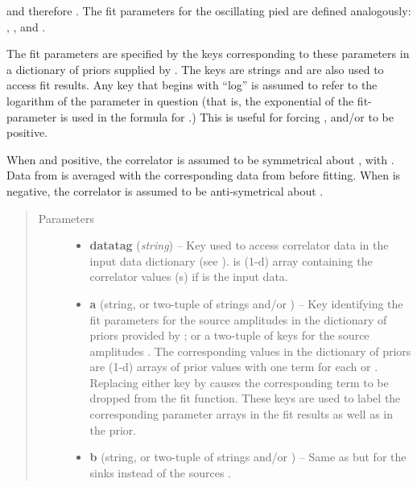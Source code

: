 \documentclass[letterpaper,10pt,english]{sphinxmanual}
\begin{document}
\begin{fulllineitems}
and therefore . The fit parameters for
the oscillating pied are defined analogously: , ,
and .

The fit parameters are specified by the keys corresponding to these
parameters in a dictionary of priors supplied by {\hyperref[corrfitter:corrfitter.CorrFitter]{}}. The keys
are strings and are also used to access fit results. Any key that
begins with ``log'' is assumed to refer to the logarithm of the parameter
in question (that is, the exponential of the fit-parameter is used in
the formula for .) This is useful for forcing , 
and/or  to be positive.

When  and positive, the correlator is assumed to be
symmetrical about , with . Data from
 is averaged with the corresponding data from 
before fitting. When  is negative, the correlator is assumed to
be anti-symetrical about .
\begin{quote}\begin{description}
\item[{Parameters}] \leavevmode\begin{itemize}
\item {} 
\textbf{datatag} (\emph{string}) -- Key used to access correlator data in the input data 
dictionary (see {\hyperref[corrfitter:corrfitter.CorrFitter]{}}).  is (1-d) 
array containing the correlator values (s) if  is the 
input data.

\item {} 
\textbf{a} (string, or two-tuple of strings and/or ) -- Key identifying the fit parameters for the source amplitudes
 in the dictionary of priors provided by {\hyperref[corrfitter:corrfitter.CorrFitter]{}}; or a
two-tuple of keys for the source amplitudes . The
corresponding values in the dictionary of priors are (1-d) arrays
of prior values with one term for each  or .
Replacing either key by  causes the corresponding term to
be dropped from the fit function. These keys are used to label the
corresponding parameter arrays in the fit results as well as in the
prior.

\item {} 
\textbf{b} (string, or two-tuple of strings and/or ) -- Same as  but for the sinks  instead of
the sources .


\end{itemize}
\end{description}
\end{quote}
\end{fulllineitems}
\end{document}
